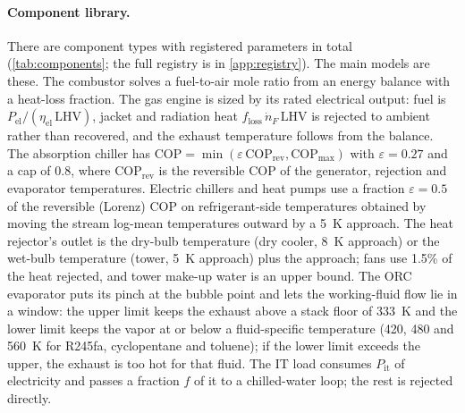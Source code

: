 \paragraph{Component library.}
There are  component types with  registered parameters in total
(\cref{tab:components}; the full registry is in \cref{app:registry}). The main models are these. The combustor
solves a fuel-to-air mole ratio from an energy balance with a heat-loss fraction. The gas engine is sized by its
rated electrical output: fuel is $P_{\mathrm{el}}/(\eta_{\mathrm{el}}\,\mathrm{LHV})$, jacket and radiation heat
$f_{\mathrm{loss}}\,\dot n_F\,\mathrm{LHV}$ is rejected to ambient rather than recovered, and the exhaust
temperature follows from the balance. The absorption chiller has
$\mathrm{COP}=\min(\varepsilon\,\mathrm{COP}_{\mathrm{rev}},\mathrm{COP}_{\max})$ with $\varepsilon=0.27$ and a
cap of $0.8$, where $\mathrm{COP}_{\mathrm{rev}}$ is the reversible COP of the generator, rejection and
evaporator temperatures. Electric chillers and heat pumps use a fraction $\varepsilon=0.5$ of the reversible (Lorenz)
COP on refrigerant-side temperatures obtained by moving the stream log-mean temperatures outward by a 5~K approach.
The heat rejector's outlet is the dry-bulb temperature (dry cooler, 8~K approach) or the wet-bulb temperature (tower,
5~K approach) plus the approach; fans use 1.5\% of the heat rejected, and tower make-up water is an upper bound.
The ORC evaporator puts its pinch at the bubble point and lets the working-fluid flow lie in a window: the upper limit keeps the
exhaust above a stack floor of 333~K and the lower limit keeps the vapor at or below a fluid-specific temperature
(420, 480 and 560~K for R245fa, cyclopentane and toluene); if the lower limit exceeds the upper, the exhaust is too hot
for that fluid. The IT load consumes $P_{\mathrm{it}}$ of electricity and passes a fraction $f$ of it to a chilled-water
loop; the rest is rejected directly.

\begin{table}[tbp]
\centering

\caption{Component library, generated from \texttt{core.components} (\texttt{REQUIRED\_PORTS},
\texttt{PORT\_CLASS}, \texttt{PARAMS}). Ports are marked g (gas) or l (liquid).}
\label{tab:components}
\end{table}


